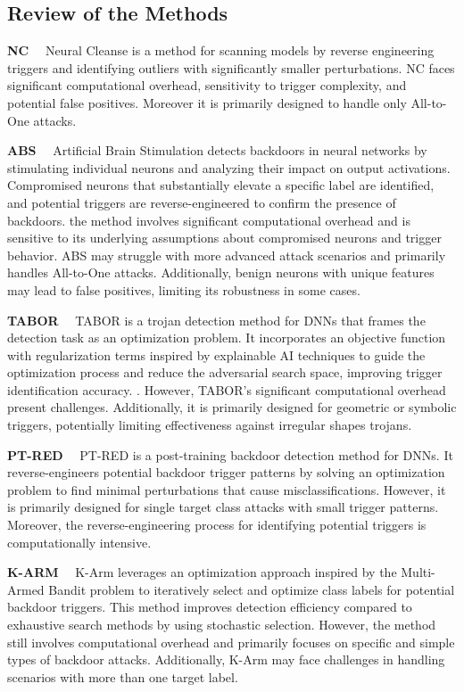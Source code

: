 \subsection{Review of the Methods}
\label{app:baselines}

\textbf{NC} \ \
Neural Cleanse \cite{NC} is a method for scanning models by reverse engineering triggers and identifying outliers with significantly smaller perturbations. NC faces significant computational overhead, sensitivity to trigger complexity, and potential false positives. Moreover it is primarily designed to handle only All-to-One attacks.

\textbf{ABS} \ \
Artificial Brain Stimulation \cite{ABS} detects backdoors in neural networks by stimulating individual neurons and analyzing their impact on output activations. Compromised neurons that substantially elevate a specific label are identified, and potential triggers are reverse-engineered to confirm the presence of backdoors. the method involves significant computational overhead and is sensitive to its underlying assumptions about compromised neurons and trigger behavior. ABS may struggle with more advanced attack scenarios and primarily handles All-to-One attacks. Additionally, benign neurons with unique features may lead to false positives, limiting its robustness in some cases.

\textbf{TABOR} \ \
TABOR \cite{TABOR} is a trojan detection method for DNNs that frames the detection task as an optimization problem. It incorporates an objective function with regularization terms inspired by explainable AI techniques to guide the optimization process and reduce the adversarial search space, improving trigger identification accuracy. . However, TABOR's significant computational overhead present challenges. Additionally, it is primarily designed for geometric or symbolic triggers, potentially limiting effectiveness against irregular shapes trojans.



\textbf{PT-RED} \ \
PT-RED \cite{PTRED} is a post-training backdoor detection method for DNNs. It reverse-engineers potential backdoor trigger patterns by solving an optimization problem to find minimal perturbations that cause misclassifications. However, it is primarily designed for single target class attacks with small trigger patterns. Moreover, the reverse-engineering process for identifying potential triggers is computationally intensive. 



\textbf{K-ARM} \ \
K-Arm \cite{kARM} leverages an optimization approach inspired by the Multi-Armed Bandit problem to iteratively select and optimize class labels for potential backdoor triggers. This method improves detection efficiency compared to exhaustive search methods by using stochastic selection. However, the method still involves computational overhead and primarily focuses on specific and simple types of backdoor attacks. Additionally, K-Arm may face challenges in handling scenarios with more than one target label.

